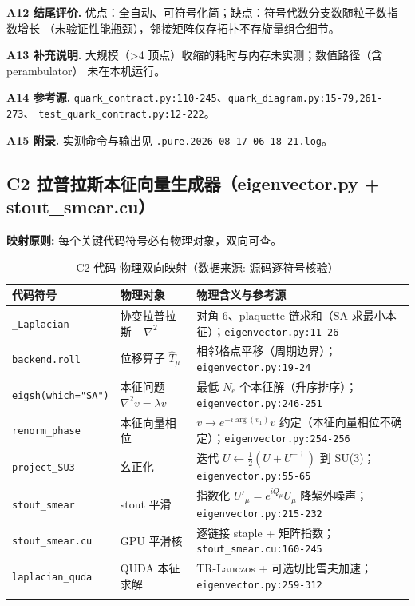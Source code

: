 \documentclass[UTF8]{ctexart}
\begin{document}
\textbf{A12 结尾评价.} 优点：全自动、可符号化简；缺点：符号代数分支数随粒子数指数增长
（\textcolor{warn}{未验证}性能瓶颈），邻接矩阵仅存拓扑不存旋量组合细节。

\textbf{A13 补充说明.} 大规模（>4 顶点）收缩的耗时与内存未实测；数值路径（含 perambulator）
未在本机运行。

\textbf{A14 参考源.} \texttt{\nolinkurl{quark_contract.py:110-245}}、\texttt{\nolinkurl{quark_diagram.py:15-79,261-273}}、
\texttt{\nolinkurl{test_quark_contract.py:12-222}}。

\textbf{A15 附录.} 实测命令与输出见 \texttt{\nolinkurl{.pure.2026-08-17-06-18-21.log}}。

\subsection{C2 拉普拉斯本征向量生成器（eigenvector.py + stout\_smear.cu）}

\begin{mapbox}
\textbf{映射原则:} 每个关键代码符号必有物理对象，双向可查。
\end{mapbox}

{\footnotesize\begin{xltabular}{\textwidth}{XlX}
\toprule
\textcolor{map}{代码符号} & 物理对象 & 物理含义与参考源 \\
\midrule
\endhead
\texttt{\nolinkurl{_Laplacian}} & 协变拉普拉斯 $-\nabla^2$ & 对角 6、plaquette 链求和（SA 求最小本征）；\texttt{\nolinkurl{eigenvector.py:11-26}} \\
\texttt{\nolinkurl{backend.roll}} & 位移算子 $\hat T_\mu$ & 相邻格点平移（周期边界）；\texttt{\nolinkurl{eigenvector.py:19-24}} \\
\texttt{eigsh(which="SA")} & 本征问题 $\nabla^2 v=\lambda v$ & 最低 $N_e$ 个本征解（升序排序）；\texttt{\nolinkurl{eigenvector.py:246-251}} \\
\texttt{\nolinkurl{renorm_phase}} & 本征向量相位 & $v\to e^{-i\arg(v_1)}v$ 约定（本征向量相位不确定）；\texttt{\nolinkurl{eigenvector.py:254-256}} \\
\texttt{\nolinkurl{project_SU3}} & 幺正化 & 迭代 $U\leftarrow\frac12(U+U^{-\dagger})$ 到 SU(3)；\texttt{\nolinkurl{eigenvector.py:55-65}} \\
\texttt{\nolinkurl{stout_smear}} & stout 平滑 & 指数化 $U'_\mu=e^{iQ_\mu}U_\mu$ 降紫外噪声；\texttt{\nolinkurl{eigenvector.py:215-232}} \\
\texttt{\nolinkurl{stout_smear.cu}} & GPU 平滑核 & 逐链接 staple + 矩阵指数；\texttt{\nolinkurl{stout_smear.cu:160-245}} \\
\texttt{\nolinkurl{laplacian_quda}} & QUDA 本征求解 & TR-Lanczos + 可选切比雪夫加速；\texttt{\nolinkurl{eigenvector.py:259-312}} \\
\bottomrule
\caption{C2 代码-物理双向映射（数据来源: 源码逐符号核验）}
\end{xltabular}}
\end{document}

